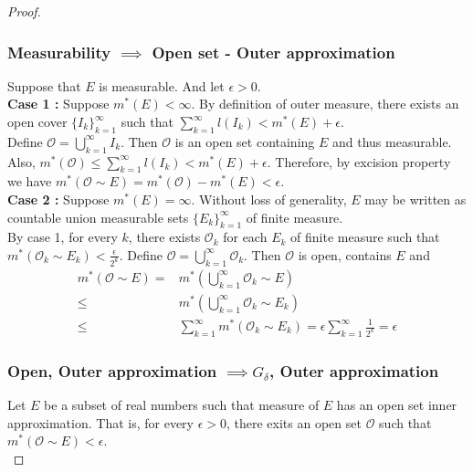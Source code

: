 \begin{proof}
\subsubsection*{Measurability $\implies$ Open set - Outer approximation}
	Suppose that $E$ is measurable.
	And let $\epsilon > 0$.\\


	\textbf{Case 1 :} Suppose $m^\ast(E) < \infty$.
	By definition of outer measure, there exists an open cover $\{ I_k \}_{k=1}^\infty$ such that $\displaystyle\sum_{k=1}^\infty l(I_k) <  m^\ast(E)+\epsilon$.\\

	Define $\mathcal{O} = \displaystyle\bigcup_{k=1}^\infty I_k$.
	Then $\mathcal{O}$ is an open set containing $E$ and thus measurable.
	Also, $m^\ast(\mathcal{O}) \le \displaystyle\sum_{k=1}^\infty l(I_k) < m^\ast(E) + \epsilon$.
	Therefore, by excision property we have $m^\ast(\mathcal{O} \sim E) = m^\ast(\mathcal{O}) - m^\ast(E) < \epsilon$. \\

	\textbf{Case 2 :} Suppose $m^\ast(E) = \infty$.
	Without loss of generality, $E$ may be written as countable union measurable sets $\{ E_k \}_{k=1}^\infty$ of finite measure.\\

	By case 1, for every $k$, there exists $\mathcal{O}_k$ for each $E_k$ of finite measure such that $m^\ast(\mathcal{O}_k \sim E_k) < \frac{\epsilon}{2^k}$.
	Define $\mathcal{O} = \displaystyle\bigcup_{k=1}^\infty \mathcal{O}_k$.
	Then $\mathcal{O}$ is open, contains $E$ and 
	\begin{align*}
		m^\ast(\mathcal{O} \sim E) = & m^\ast\left(\bigcup_{k=1}^\infty \mathcal{O}_k \sim E \right) \\
		\le & m^\ast \left(\bigcup_{k=1}^\infty \mathcal{O}_k \sim E_k \right) \\
		\le & \sum_{k=1}^\infty m^\ast(\mathcal{O}_k \sim E_k) = \epsilon \sum_{k=1}^\infty \frac{1}{2^k} = \epsilon
	\end{align*}

\subsubsection*{Open, Outer approximation $\implies G_\delta$, Outer approximation }
	Let $E$ be a subset of real numbers such that measure of $E$ has an open set inner approximation.
	That is, for every $\epsilon > 0$, there exits an open set $\mathcal{O}$ such that $m^\ast(\mathcal{O} \sim E) < \epsilon$.\\


\end{proof}
